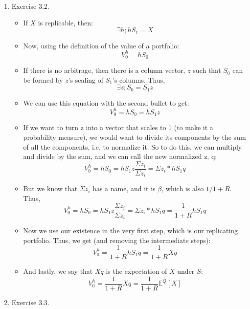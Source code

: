\documentclass[12pt]{article}
\newcommand{\Ex}{\mathbf{E}}
\begin{document}
\begin{enumerate}
\begin{itemize}
\begin{comment} 
  \textit{Solution}: The arbitrage free date 0 price of $Put4$ is $\frac{1}{2} \Ex^{(\frac{1}{4}, \frac{1}{4}, \frac{1}{2})} Put4_1 = \frac{1}{2} (\frac{1}{2} \cdot 2) = \frac{1}{2}$.
\end{comment}
\end{itemize}
  \item Exercise 3.2.
  \begin{itemize}
      \item If $X$ is replicable, then:
      $$\exists h; hS_1 = X$$
      \item Now, using the definition of the value of a portfolio:
      $$V_0^h = hS_0$$
      \item If there is no arbitrage, then there is a column vector, $z$ such that $S_0$ can be formed by $z$'s scaling of $S_1$'s columns. Thus,
      $$\exists z; S_0 = S_1z$$
      \item We can use this equation with the second bullet to get:
      $$V_0^h = hS_0 = hS_1z$$
      \item If we want to turn z into a vector that scales to 1 (to make it a probability measure), we would want to divide its components by the sum of all the components, i.e. to normalize it. So to do this, we can multiply and divide by the sum, and we can call the new normalized z, q:
      $$V_0^h = hS_0 = hS_1z \frac{\Sigma z_i}{\Sigma z_i} = \Sigma z_i * hS_1q $$
      \item But we know that $\Sigma z_i$ has a name, and it is $\beta$, which is also $1/1+R$. Thus,
      $$V_0^h = hS_0 = hS_1z \frac{\Sigma z_i}{\Sigma z_i} = \Sigma z_i * hS_1q =  \frac{1}{1+R}hS_1q$$
      \item Now we use our existence in the very first step, which is our replicating portfolio.  Thus, we get (and removing the intermediate steps):
      $$V_0^h =  \frac{1}{1+R}hS_1q = \frac{1}{1+R}Xq $$
      \item And lastly, we say that $Xq$ is the expectation of $X$ under $S$:
      $$V_0^h = \frac{1}{1+R}Xq = \frac{1}{1+R}\mathbb{E}^Q[X]$$
  \end{itemize}
  \item Exercise 3.3.

\end{enumerate}
\end{document}

